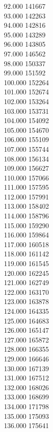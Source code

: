 { 92.000	141667 \\
 93.000	142263 \\
 94.000	142816 \\
 95.000	143289 \\
 96.000	143805 \\
 97.000	146562 \\
 98.000	150337 \\
 99.000	151592 \\
 100.000	152264 \\
 101.000	152674 \\
 102.000	153264 \\
 103.000	153731 \\
 104.000	154092 \\
 105.000	154670 \\
 106.000	155109 \\
 107.000	155744 \\
 108.000	156134 \\
 109.000	156627 \\
 110.000	157066 \\
 111.000	157595 \\
 112.000	157991 \\
 113.000	158402 \\
 114.000	158796 \\
 115.000	159290 \\
 116.000	159864 \\
 117.000	160518 \\
 118.000	161142 \\
 119.000	161545 \\
 120.000	162245 \\
 121.000	162749 \\
 122.000	163170 \\
 123.000	163878 \\
 124.000	164335 \\
 125.000	164683 \\
 126.000	165147 \\
 127.000	165872 \\
 128.000	166355 \\
 129.000	166646 \\
 130.000	167139 \\
 131.000	167512 \\
 132.000	168026 \\
 133.000	168699 \\
 134.000	171798 \\
 135.000	175093 \\
 136.000	175641 \\
}
